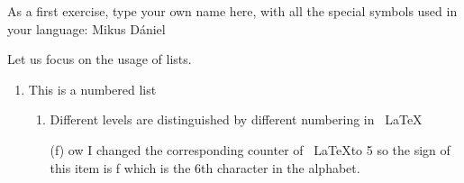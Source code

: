 \documentclass[12pt]{article}
\begin{document}
As a first exercise, type your own name here, with all the special symbols used in your language: Mikus Dániel \par
Let us focus on the usage of lists.
\begin{enumerate}
    \item This is a numbered list
    \begin{enumerate}
        \item Different levels are distinguished by different numbering in ~\LaTeX
        \item[(f)] ow I changed the corresponding counter of ~\LaTeX to 5 so the sign of this item is f which is the 6th character in the alphabet.
    \end{enumerate}
\end{enumerate}
\end{document}
